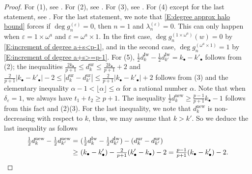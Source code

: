 \documentclass[12pt]{amsart}
\theoremstyle{definition}
\numberwithin{equation}{subsection}
\newcommand{\new}{\mathrm{new}}
\newcommand{\Iw}{\mathrm{Iw}}
\newcommand{\ur}{\mathrm{ur}}
\begin{document}
\begin{proof}
For (1), see \cite[Proposition~4.1]{liu-truong-xiao-zhao}. For (2), see \cite[Corollary~4.4]{liu-truong-xiao-zhao}. For (3), see \cite[Proposition~4.7]{liu-truong-xiao-zhao}. For (4) except for the last statement, see \cite[Proposition~4.11]{liu-truong-xiao-zhao}.  For the last statement, we note that \eqref{E:degree approx halo bound} forces if $\deg g_n^{(\varepsilon)} = 0$, then $n=1$ and $\lambda_n^{(\varepsilon)}=0$. This can only happen when $\varepsilon = 1\times \omega^a$ and $\varepsilon = \omega^a\times 1$. In the first case, $\deg g_n^{(1 \times \omega^a)}(w) = 0$ by \eqref{E:increment of degree a+s<p-1}, and in the second case, $\deg g_n^{(\omega^a \times 1)} = 1$ by \eqref{E:increment of degree a+s>=p-1}. For (5), $\tfrac 12 d_k^\Iw - \tfrac 12 d_{k'}^\Iw = k_\bullet - k'_\bullet$ follows from (2); the inequalities $\tfrac{2k_\bullet}{p+1}\leq d_k^\ur\leq \tfrac{2k_\bullet}{p+1}+2$ and  $\tfrac{2}{p+1}|k_\bullet-k'_\bullet| - 2 \leq |d_k^\ur - d_{k'}^\ur| \leq \tfrac{2}{p+1}|k_\bullet-k'_\bullet| + 2$ follows from (3) and the elementary inequality $\alpha -1 < \lfloor \alpha \rfloor \leq \alpha$ for a rational number $\alpha$. Note that when $\delta_\varepsilon=1$, we always have $t_1+t_2\geq p+1$. The inequality $\tfrac 12 d_k^\new \geq \tfrac {p-1}{p+1}k_\bullet -1$ follows from this fact and (2)(3). For the last inequality, we note that $d_k^\new$ is non-decreasing with respect to $k$, thus, we may assume that $k>k'$. So we deduce the last inequality as follows
\begin{align*}\tfrac 12 d_k^\new-\tfrac 12d_{k'}^\new=\ & (\tfrac 12 d_k^\Iw - \tfrac 12d_{k'}^\Iw) -(d_{k}^\ur-d_{k'}^\ur)
\\
\geq\ & (k_\bullet - k'_\bullet) -\tfrac{2}{p+1}(k'_\bullet - k_\bullet) -2= \tfrac{p-1}{p+1}(k_\bullet-k'_\bullet) -2.
\qedhere
\end{align*}
\end{proof}
\end{document}
